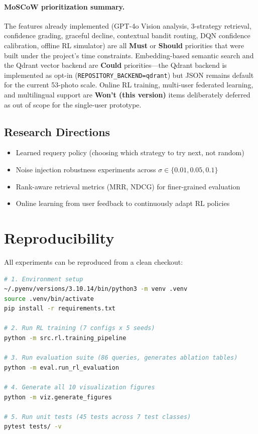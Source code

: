 \documentclass[11pt,letterpaper]{article}
\begin{document}
\paragraph{MoSCoW prioritization summary.} The features already implemented (GPT-4o Vision analysis, 3-strategy retrieval, confidence grading, graceful decline, contextual bandit routing, DQN confidence calibration, offline RL simulator) are all \textbf{Must} or \textbf{Should} priorities that were built under the project's time constraints. Embedding-based semantic search and the Qdrant vector backend are \textbf{Could} priorities---the Qdrant backend is implemented as opt-in (\texttt{REPOSITORY\_BACKEND=qdrant}) but JSON remains default for the current 53-photo scale. Online RL training, multi-user federated learning, and multilingual support are \textbf{Won't (this version)} items deliberately deferred as out of scope for the single-user prototype.

\subsection{Research Directions}

\begin{itemize}[nosep]
  \item Learned requery policy (choosing which strategy to try next, not random)
  \item Noise injection robustness experiments across $\sigma \in \{0.01, 0.05, 0.1\}$
  \item Rank-aware retrieval metrics (MRR, NDCG) for finer-grained evaluation
  \item Online learning from user feedback to continuously adapt RL policies
\end{itemize}

\section{Reproducibility}
\label{sec:reproducibility}

All experiments can be reproduced from a clean checkout:

\begin{lstlisting}[language=bash,caption={Complete reproduction pipeline.}]
# 1. Environment setup
~/.pyenv/versions/3.10.14/bin/python3 -m venv .venv
source .venv/bin/activate
pip install -r requirements.txt

# 2. Run RL training (7 configs x 5 seeds)
python -m src.rl.training_pipeline

# 3. Run evaluation suite (86 queries, generates ablation tables)
python -m eval.run_rl_evaluation

# 4. Generate all 10 visualization figures
python -m viz.generate_figures

# 5. Run unit tests (45 tests across 7 test classes)
pytest tests/ -v
\end{lstlisting}
\end{document}
